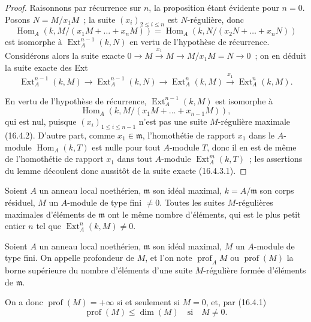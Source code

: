 \begin{proof}
Raisonnons par récurrence sur $n$, la proposition étant évidente pour $n=0$.
Posons $N=M/x_1M$~; la suite $(x_i)_{2\leq i\leq n}$ est $N$-régulière, donc
\[
  \operatorname{Hom}_A(k,M/(x_1M+\ldots+x_nM))
  =\operatorname{Hom}_A(k,N/(x_2N+\ldots+x_nN))
\]
est isomorphe à $\operatorname{Ext}^{n-1}_A(k,N)$ en vertu de l'hypothèse de
récurrence. Considérons alors la suite exacte
$0\to M\xrightarrow{x_1}M\to M/x_1M=N\to0$~; on en déduit la suite exacte des
Ext
\begin{equation}
\label{0.16.4.3.1-fr}
\tag{16.4.3.1}
  \operatorname{Ext}^{n-1}_A(k,M)
  \to\operatorname{Ext}^{n-1}_A(k,N)
  \to\operatorname{Ext}^n_A(k,M)
  \xrightarrow{x_1}\operatorname{Ext}^n_A(k,M).
\end{equation}

En vertu de l'hypothèse de récurrence, $\operatorname{Ext}^{n-1}_A(k,M)$ est
isomorphe à
\[
  \operatorname{Hom}_A(k,M/(x_1M+\ldots+x_{n-1}M)),
\]
qui est nul, puisque $(x_i)_{1\leq i\leq n-1}$ n'est pas une suite
$M$-régulière maximale (16.4.2). D'autre part, comme
$x_1\in\mathfrak{m}$, l'homothétie de rapport $x_1$ dans le $A$-module
$\operatorname{Hom}_A(k,T)$ est nulle pour tout $A$-module $T$, donc il en est
de même de l'homothétie de rapport $x_1$ dans tout $A$-module
$\operatorname{Ext}^m_A(k,T)$~; les assertions du lemme découlent donc
aussitôt de la suite exacte (16.4.3.1).
\end{proof}

\begin{corollary}[16.4.4]
\label{0.16.4.4-fr}
Soient $A$ un anneau local noethérien, $\mathfrak{m}$ son idéal maximal,
$k=A/\mathfrak{m}$ son corps résiduel, $M$ un $A$-module de type fini
$\neq0$. Toutes les suites $M$-régulières maximales d'éléments de
$\mathfrak{m}$ ont le même nombre d'éléments, qui est le plus petit entier $n$
tel que $\operatorname{Ext}^n_A(k,M)\neq0$.
\end{corollary}

\begin{definition}[16.4.5]
\label{0.16.4.5-fr}
Soient $A$ un anneau local noethérien, $\mathfrak{m}$ son idéal maximal, $M$ un
$A$-module de type fini. On appelle profondeur de $M$, et l'on note
$\operatorname{prof}_A M$ ou $\operatorname{prof}(M)$ la borne supérieure du
nombre d'éléments d'une suite $M$-régulière formée d'éléments de
$\mathfrak{m}$.
\end{definition}

On a donc $\operatorname{prof}(M)=+\infty$ si et seulement si
$M=0$, et, par (16.4.1)
\begin{equation}
\label{0.16.4.5.1-fr}
\tag{16.4.5.1}
  \operatorname{prof}(M)\leq\dim(M)\quad\text{si}\quad M\neq0.
\end{equation}

